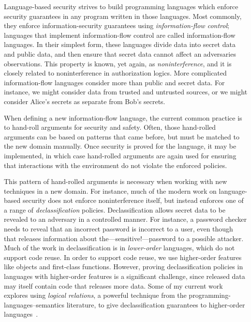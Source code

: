 \documentclass{article}
\theoremstyle{definition}
\begin{document}
Language-based security strives to build programming languages which enforce security guarantees in any program written in those languages.
Most commonly, they enforce information-security guarantees using \emph{information-flow control}; languages that implement information-flow control are called information-flow languages.
In their simplest form, these languages divide data into secret data and public data, and then ensure that secret data cannot affect an adversaries observations.
This property is known, yet again, as \emph{noninterference}, and it is closely related to noninterference in authorization logics.
More complicated information-flow languages consider more than public and secret data.
For instance, we might consider data from trusted and untrusted sources, or we might consider Alice's secrets as separate from Bob's secrets.

When defining a new information-flow language, the current common practice is to hand-roll arguments for security and safety.
Often, those hand-rolled arguments can be based on patterns that came before, but must be matched to the new domain manually.
Once security is proved for the language, it may be implemented, in which case hand-rolled arguments are again used for ensuring that interactions with the environment do not violate the enforced policies.

This pattern of hand-rolled arguments is necessary when working with new techniques in a new domain.
For instance, much of the modern work on language-based security does not enforce noninterference itself, but instead enforces one of a range of \emph{declassification} policies.
Declassification allows secret data to be revealed to an adversary in a controlled manner.
For instance, a password checker needs to reveal that an incorrect password is incorrect to a user, even though that releases information about the---sensitive!---password to a possible attacker.
Much of the work in declassification is in \emph{lower-order} languages, which do not support code reuse.
In order to support code reuse, we use higher-order features like objects and first-class functions.
However, proving declassification policies in languages with higher-order features is a significant challenge, since released data may itself contain code that releases more data.
Some of my current work explores using \emph{logical relations}, a powerful technique from the programming-languages--semantics literature, to give declassification guarantees to higher-order languages~\citep{MenzHLG22}.
\end{document}
